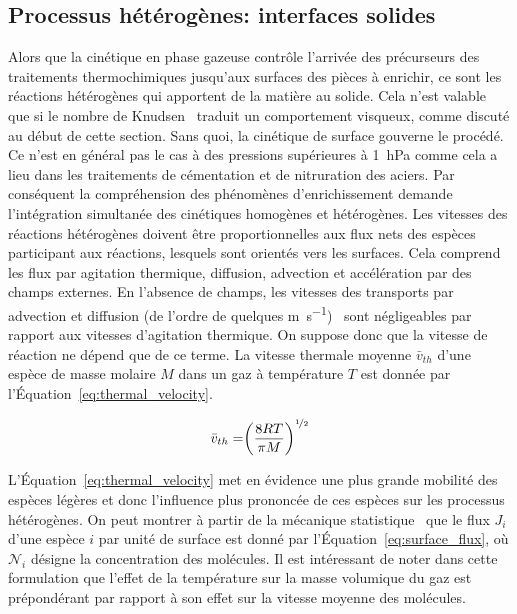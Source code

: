 \subsection{Processus hétérogènes: interfaces solides}

Alors que la cinétique en phase gazeuse contrôle l'arrivée des précurseurs des traitements thermochimiques jusqu'aux surfaces des pièces à enrichir, ce sont les réactions hétérogènes qui apportent de la matière au solide. Cela n'est valable que si le nombre de Knudsen~\cite{Hershey1973} traduit un comportement visqueux, comme discuté au début de cette section. Sans quoi, la cinétique de surface gouverne le procédé. Ce n'est en général pas le cas à des pressions supérieures à \SI{1}{\hecto\pascal} comme cela a lieu dans les traitements de cémentation et de  nitruration des aciers. Par conséquent la compréhension des phénomènes d'enrichissement demande l'intégration simultanée des cinétiques homogènes et hétérogènes. Les vitesses des réactions hétérogènes doivent être proportionnelles aux flux nets des espèces participant aux réactions, lesquels sont orientés vers les surfaces. Cela comprend les flux par agitation thermique, diffusion, advection et accélération par des champs externes. En l'absence de champs, les vitesses des transports par advection et diffusion (de l'ordre de quelques \si{\metre\per\second})~\cite{Bird,Atkins2006} sont négligeables par rapport aux vitesses d'agitation thermique. On suppose donc que la vitesse de réaction ne dépend que de ce terme. La vitesse thermale moyenne $\bar{v}_{th}$ d'une espèce de masse molaire $M$ dans un gaz à température $T$ est donnée par l'Équation~\ref{eq:thermal_velocity}.

\begin{equation}
  \bar{v}_{th}=\biggr(\frac{8RT}{\pi{M}}\biggr)^{\nicefrac{1}{2}}
  \label{eq:thermal_velocity}
\end{equation}

L'Équation~\ref{eq:thermal_velocity} met en évidence une plus grande mobilité des espèces légères et donc l'influence plus prononcée de ces espèces sur les processus hétérogènes. On peut montrer à partir de la mécanique statistique~\cite{Atkins2006} que le flux $J_{i}$ d'une espèce $i$ par unité de surface est donné par l'Équation~\ref{eq:surface_flux}, où $\mathcal{N}_{i}$ désigne la concentration des molécules. Il est intéressant de noter dans cette formulation que l'effet de la température sur la masse volumique du gaz est prépondérant par rapport à son effet sur la vitesse moyenne des molécules.

